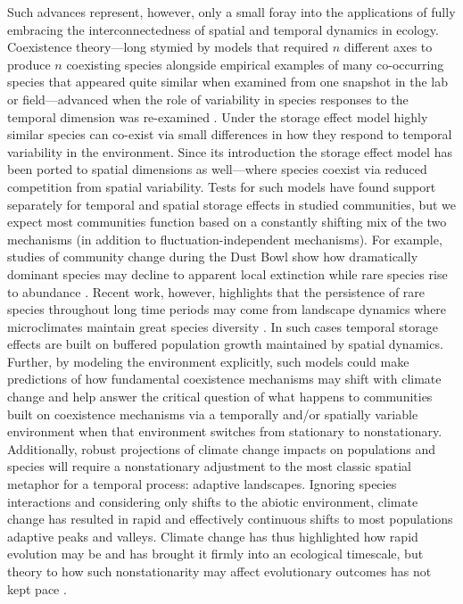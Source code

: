 \documentclass[11pt,a4paper,oneside]{article}
\begin{document}
Such advances represent, however, only a small foray into the applications of fully embracing the interconnectedness of spatial and temporal dynamics in ecology. Coexistence theory---long stymied by models that required \(n\) different axes to produce \(n\) coexisting species alongside empirical examples of many co-occurring species that appeared quite similar when examined from one snapshot in the lab or field---advanced when the role of variability in species responses to the temporal dimension was re-examined \citep{Chesson:1997dz}. Under the storage effect model \citep{Chesson:1997dz} highly similar species can co-exist via small differences in how they respond to temporal variability in the environment. Since its introduction the storage effect model has been ported to spatial dimensions as well---where species coexist via reduced competition from spatial variability. Tests for such models have found support separately for temporal \citep{Angert:2009} and spatial \citep{Sears:2007md} storage effects in studied communities, but we expect most communities function based on a constantly shifting mix of the two mechanisms (in addition to fluctuation-independent mechanisms). For example, studies of community change during the Dust Bowl show how dramatically dominant species may decline to apparent local extinction while rare species rise to abundance \citep{Weaver1936}. Recent work, however, highlights that the persistence of rare species throughout long time periods may come from landscape dynamics where microclimates maintain great species diversity \cite{Craine2012}. In such cases temporal storage effects are built on buffered population growth maintained by spatial dynamics. Further, by modeling the environment explicitly, such models could make predictions of how fundamental coexistence mechanisms may shift with climate change and help answer the critical question of what happens to communities built on coexistence mechanisms via a temporally and/or spatially variable environment when that environment switches from stationary to nonstationary. Additionally, robust projections of climate change impacts on populations and species will require a nonstationary adjustment to the most classic spatial metaphor for a temporal process: adaptive landscapes. Ignoring species interactions and considering only shifts to the abiotic environment, climate change has resulted in rapid and effectively continuous shifts to most populations adaptive peaks and valleys. Climate change has thus highlighted how rapid evolution may be and has brought it firmly into an ecological timescale, but theory to how such nonstationarity may affect evolutionary outcomes has not kept pace \citep{schoener2011}. \\ %
\end{document}
